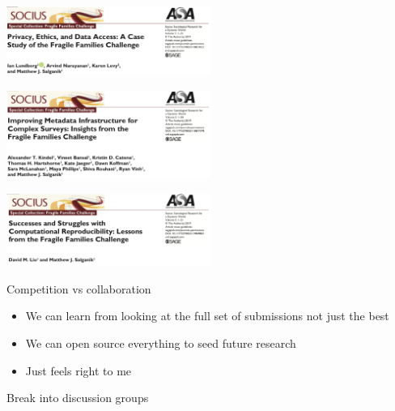 \documentclass[aspectratio=169]{beamer}
\begin{document}
\begin{frame}

\begin{center}
\includegraphics[width=0.5\textwidth]{figures/lundberg_privacy_2019_title}
\end{center}

\pause
\vfill

\begin{center}
\includegraphics[width=0.5\textwidth]{figures/kindel_improving_2019_title}
\end{center}

\pause
\vfill

\begin{center}
\includegraphics[width=0.5\textwidth]{figures/liu_successes_2019_title}
\end{center}

\end{frame}
\begin{frame}

Competition vs collaboration
\begin{itemize}
\item We can learn from looking at the full set of submissions not just the best
\pause
\item We can open source everything to seed future research
\pause
\item Just feels right to me
\end{itemize}

\end{frame}
\begin{frame}

Break into discussion groups

\end{frame}
\end{document}
